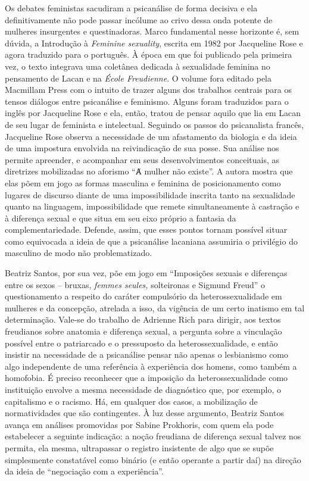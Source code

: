 Os debates feministas sacudiram a psicanálise de forma decisiva e ela
definitivamente não pode passar incólume ao crivo dessa onda potente de
mulheres insurgentes e questinadoras. Marco fundamental nesse horizonte
é, sem dúvida, a Introdução à \emph{Feminine sexuality}, escrita em 1982
por Jacqueline Rose e agora traduzido para o português. À época em que
foi publicado pela primeira vez, o texto integrava uma coletânea
dedicada à sexualidade feminina no pensamento de Lacan e na \emph{École
Freudienne}. O volume fora editado pela Macmillam Press com o intuito de
trazer alguns dos trabalhos centrais para os tensos diálogos entre
psicanálise e feminismo. Alguns foram traduzidos para o inglês por
Jacqueline Rose e ela, então, tratou de pensar aquilo que lia em Lacan
de seu lugar de feminista e intelectual. Seguindo os passos do
psicanalista francês, Jacqueline Rose observa a necessidade de um
afastamento da biologia e da ideia de uma impostura envolvida na
reivindicação de sua posse. Sua análise nos permite apreender, e
acompanhar em seus desenvolvimentos conceituais, as diretrizes
mobilizadas no aforismo ``Ⱥ mulher não existe''. A autora mostra que
elas põem em jogo as formas masculina e feminina de posicionamento como
lugares de discurso diante de uma impossibilidade inscrita tanto na
sexualidade quanto na linguagem, impossibilidade que remete
simultaneamente à castração e à diferença sexual e que situa em seu eixo
próprio a fantasia da complementariedade. Defende, assim, que esses
pontos tornam possível situar como equivocada a ideia de que a
psicanálise lacaniana assumiria o privilégio do masculino de modo não
problematizado.

Beatriz Santos, por sua vez, põe em jogo em ``Imposições sexuais e
diferenças entre os sexos -- bruxas, \emph{femmes seules,} solteironas e
Sigmund Freud'' o questionamento a respeito do caráter compulsório da
heterossexualidade em mulheres e da concepção, atrelada a isso, da
vigência de um certo inatismo em tal determinação. Vale-se do trabalho
de Adrienne Rich para dirigir, aos textos freudianos sobre anatomia e
diferença sexual, a pergunta sobre a vinculação possível entre o
patriarcado e o pressuposto da heterossexualidade, e então insistir na
necessidade de a psicanálise pensar não apenas o lesbianismo como algo
independente de uma referência à experiência dos homens, como também a
homofobia. É preciso reconhecer que a imposição da heterossexualidade
como instituição envolve a mesma necessidade de diagnóstico que, por
exemplo, o capitalismo e o racismo. Há, em qualquer dos casos, a
mobilização de normatividades que são contingentes. À luz desse
argumento, Beatriz Santos avança em análises promovidas por Sabine
Prokhoris, com quem ela pode estabelecer a seguinte indicação: a noção
freudiana de diferença sexual talvez nos permita, ela mesma, ultrapassar
o registro insistente de algo que se supõe simplesmente constatável como
binário (e então operante a partir daí) na direção da ideia de
``negociação com a experiência''.

